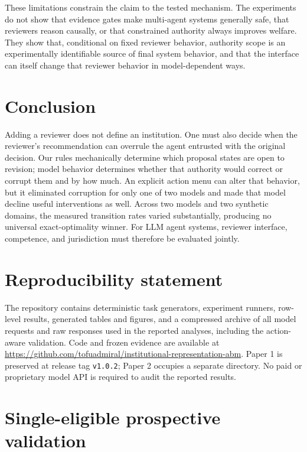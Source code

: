 \documentclass[10pt]{article}
\begin{document}
These limitations constrain the claim to the tested mechanism. The experiments
do not show that evidence gates make multi-agent systems generally safe, that
reviewers reason causally, or that constrained authority always improves welfare.
They show that, conditional on fixed reviewer behavior, authority scope is an
experimentally identifiable source of final system behavior, and that the
interface can itself change that reviewer behavior in model-dependent ways.

\section{Conclusion}

Adding a reviewer does not define an institution. One must also decide when the
reviewer's recommendation can overrule the agent entrusted with the original
decision. Our rules mechanically determine which proposal states are open to
revision; model behavior determines whether that authority would correct or
corrupt them and by how much. An explicit action menu can alter that behavior,
but it eliminated corruption for only one of two models and made that model
decline useful interventions as well. Across two models and two synthetic
domains, the measured transition rates varied substantially, producing no
universal exact-optimality winner. For LLM agent systems, reviewer interface,
competence, and jurisdiction must therefore be evaluated jointly.

\section*{Reproducibility statement}

The repository contains deterministic task generators, experiment runners,
row-level results, generated tables and figures, and a compressed archive of all
model requests and raw responses used in the reported analyses, including the
action-aware validation. Code and frozen evidence are available at
\url{https://github.com/tofuadmiral/institutional-representation-abm}. Paper 1
is preserved at release tag
\texttt{v1.0.2}; Paper 2 occupies a separate directory. No paid or proprietary
model API is required to audit the reported results.


\begingroup
\footnotesize

\endgroup

\appendix
\small
\section{Single-eligible prospective validation}
\end{document}
